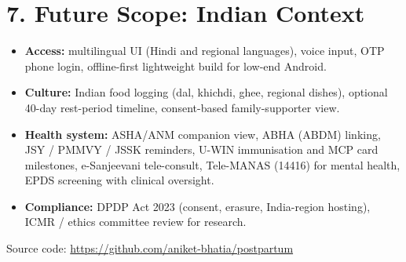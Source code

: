 \documentclass[10pt,a4paper]{article}
\begin{document}
\section{7. Future Scope: Indian Context}
\begin{itemize}
  \item \textbf{Access:} multilingual UI (Hindi and regional languages), voice input, OTP phone login, offline-first lightweight build for low-end Android.
  \item \textbf{Culture:} Indian food logging (dal, khichdi, ghee, regional dishes), optional 40-day rest-period timeline, consent-based family-supporter view.
  \item \textbf{Health system:} ASHA/ANM companion view, ABHA (ABDM) linking, JSY / PMMVY / JSSK reminders, U-WIN immunisation and MCP card milestones, e-Sanjeevani tele-consult, Tele-MANAS (14416) for mental health, EPDS screening with clinical oversight.
  \item \textbf{Compliance:} DPDP Act 2023 (consent, erasure, India-region hosting), ICMR / ethics committee review for research.
\end{itemize}

\vfill
{\footnotesize Source code: \url{https://github.com/aniket-bhatia/postpartum}}
\end{document}
